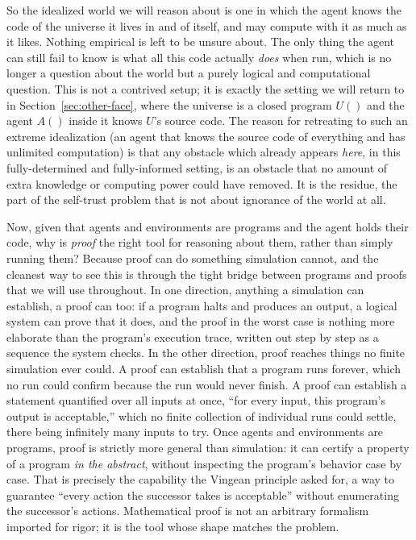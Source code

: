 \documentclass[10pt]{article}
\theoremstyle{definition}
\theoremstyle{remark}
\begin{document}
So the idealized world we will reason about is one in which the agent knows the code of the universe it lives in and of itself, and may compute with it as much as it likes. Nothing empirical is left to be unsure about. The only thing the agent can still fail to know is what all this code actually \emph{does} when run, which is no longer a question about the world but a purely logical and computational question. This is not a contrived setup; it is exactly the setting we will return to in Section~\ref{sec:other-face}, where the universe is a closed program $U()$ and the agent $A()$ inside it knows $U$'s source code. The reason for retreating to such an extreme idealization (an agent that knows the source code of everything and has unlimited computation) is that any obstacle which already appears \emph{here}, in this fully-determined and fully-informed setting, is an obstacle that no amount of extra knowledge or computing power could have removed. It is the residue, the part of the self-trust problem that is not about ignorance of the world at all.

Now, given that agents and environments are programs and the agent holds their code, why is \emph{proof} the right tool for reasoning about them, rather than simply running them? Because proof can do something simulation cannot, and the cleanest way to see this is through the tight bridge between programs and proofs that we will use throughout. In one direction, anything a simulation can establish, a proof can too: if a program halts and produces an output, a logical system can prove that it does, and the proof in the worst case is nothing more elaborate than the program's execution trace, written out step by step as a sequence the system checks. In the other direction, proof reaches things no finite simulation ever could. A proof can establish that a program runs forever, which no run could confirm because the run would never finish. A proof can establish a statement quantified over all inputs at once, ``for every input, this program's output is acceptable,'' which no finite collection of individual runs could settle, there being infinitely many inputs to try. Once agents and environments are programs, proof is strictly more general than simulation: it can certify a property of a program \emph{in the abstract}, without inspecting the program's behavior case by case. That is precisely the capability the Vingean principle asked for, a way to guarantee ``every action the successor takes is acceptable'' without enumerating the successor's actions. Mathematical proof is not an arbitrary formalism imported for rigor; it is the tool whose shape matches the problem.
\end{document}

